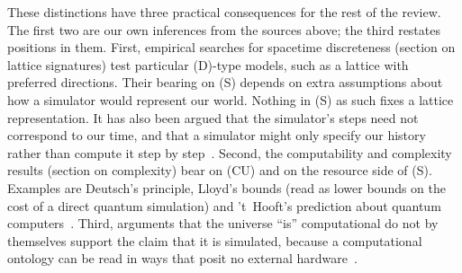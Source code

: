 These distinctions have three practical consequences for the rest of the
review. The first two are our own inferences from the sources above; the third
restates positions in them.
First, empirical searches for spacetime discreteness (section on lattice
signatures) test particular (D)-type models, such as a lattice with preferred directions. Their
bearing on (S) depends on extra assumptions about how a simulator would
represent our world. Nothing in (S) as such fixes a lattice representation.
It has also been argued that the simulator's steps need not correspond to our
time, and that a simulator might only specify our history rather than compute
it step by step~\cite{Schmidhuber1997computer,Tegmark2008mathematical}.
Second, the computability and complexity results (section on complexity) bear
on (CU) and on the resource side of (S). Examples are Deutsch's principle, Lloyd's bounds
(read as lower bounds on the cost of a direct quantum simulation) and
't~Hooft's prediction about quantum
computers~\cite{Deutsch1985quantum,Lloyd2002computational,tHooft2016cellular}.
Third, arguments that the universe ``is'' computational do not by themselves
support the claim that it is simulated, because a computational ontology can be
read in ways that posit no external hardware~\cite{Piccinini2025computation,Tegmark2008mathematical}.
